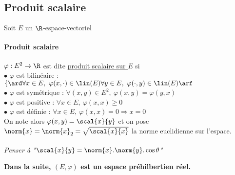 	\subsection{Produit scalaire}
		Soit $E$ un $\R$-espace-vectoriel
		\traitd
		\paragraph{Produit scalaire}
			$\varphi :E^2\to \R$ est dite \uline{produit scalaire sur $E$} si \\
			\hspace*{2.5cm} $\bullet$ $\varphi$ est bilinéaire : 
			{\scriptsize $\left\{\ard \forall x\in E ,~\varphi(x,\cdot) \in\lin(E) \\ \forall y\in E ,~\varphi(\cdot,y)\in\lin(E) \arf \right. $ }\\
			\hspace*{2.5cm} $\bullet$ $\varphi$ est symétrique : {\scriptsize $\forall (x,y)\in E^2 ,~\varphi(x,y)=\varphi(y,x)$}\\
			\hspace*{2.5cm} $\bullet$ $\varphi$ est positive : {\scriptsize $\forall x\in E ,~ \varphi(x,x) \geqslant 0$ }\\
			\hspace*{2.5cm} $\bullet$ $\varphi$ est définie : {\scriptsize $\forall x\in E ,~\varphi(x,x) =0 \Rightarrow x=0$ } \trait
		\vspace*{-1.1cm} \\ On note alors $\varphi(x,y) = \scal{x}{y}$ et on pose $\norm{x}=\norm{x}_2 = \sqrt{\scal{x}{x}}$ la norme euclidienne sur l'espace.
		\vspace*{0.5cm} \\ 
		\\\textit{ Penser à "$\scal{x}{y} = \norm{x}.\norm{y} .\cos\theta $"}	 
		\begin{center} \textbf{Dans la suite, $(E,\varphi)$ est un espace préhilbertien réel.} \end{center}

